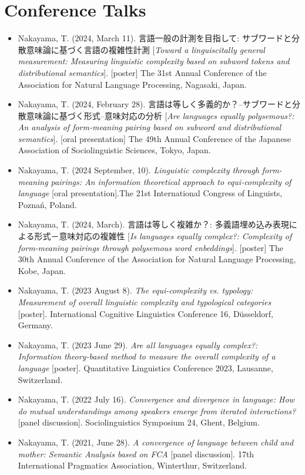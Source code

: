 \documentclass[a4paper,11pt]{article}
\begin{document}
\vspace{1em}

\section*{Conference Talks}
\begin{itemize}[leftmargin=*, itemsep=0em, topsep=0em]
  \item Nakayama, T. (2024, March 11). 言語一般の計測を目指して: サブワードと分散意味論に基づく言語の複雑性計測 [\textit{Toward a linguiscitally general measurement: Measuring linguistic complexity based on subword tokens and distributional semantics}]. [poster] The 31st Annual Conference of the Association for Natural Language Processing, Nagasaki, Japan.
  \item Nakayama, T. (2024, February 28). 言語は等しく多義的か？–サブワードと分散意味論に基づく形式–意味対応の分析 [\textit{Are languages equally polysemous?: An analysis of form-meaning pairing based on subword and distributional semantics}]. [oral presentation] The 49th Annual Conference of the Japanese Association of Sociolinguistic Sciences, Tokyo, Japan.
  \item Nakayama, T. (2024 September, 10). \textit{Linguistic complexity through form-meaning pairings: An information theoretical approach to equi-complexity of language} [oral presentation].The 21st International Congress of Linguists, Poznań, Poland.
  \item Nakayama, T. (2024, March). 言語は等しく複雑か？: 多義語埋め込み表現による形式－意味対応の複雑性 [\textit{Is languages equally complex?: Complexity of form-meaning pairings through polysemous word enbeddings}]. [poster] The 30th Annual Conference of the Association for Natural Language Processing, Kobe, Japan.
  \item Nakayama, T. (2023 August 8). \textit{The equi-complexity vs. typology: Measurement of overall linguistic complexity and typological categories} [poster]. International Cognitive Linguistics Conference 16, Düsseldorf, Germany.
  \item Nakayama, T. (2023 June 29). \textit{Are all languages equally complex?: Information theory-based method to measure the overall complexity of a language} [poster]. Quantitative Linguistics Conference 2023, Lausanne, Switzerland.
  \item Nakayama, T. (2022 July 16). \textit{Convergence and divergence in language: How do mutual understandings among speakers emerge from iterated interactions?} [panel discussion]. Sociolinguistics Symposium 24, Ghent, Belgium.
  \item Nakayama, T. (2021, June 28). \textit{A convergence of language between child and mother: Semantic Analysis based on FCA} [panel discussion]. 17th International Pragmatics Association, Winterthur, Switzerland.
\end{itemize}
\end{document}
